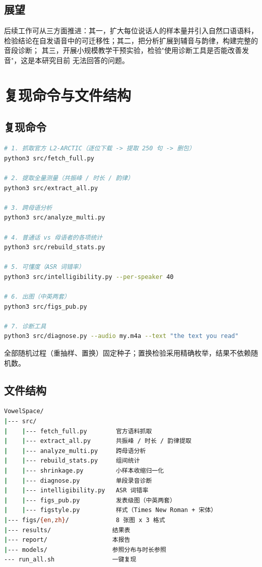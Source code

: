 \documentclass[12pt,a4paper,fontset=fandol]{ctexrep}
\begin{document}
\section{展望}

后续工作可从三方面推进：其一，扩大每位说话人的样本量并引入自然口语语料，
检验结论在自发语音中的可迁移性；其二，把分析扩展到辅音与韵律，构建完整的音段诊断；
其三，开展小规模教学干预实验，检验"使用诊断工具是否能改善发音"，这是本研究目前
无法回答的问题。

\chapter{复现命令与文件结构}\label{ch:repro}

\section{复现命令}

\begin{lstlisting}[language=bash]
# 1. 抓取官方 L2-ARCTIC（逐位下载 -> 提取 250 句 -> 删包）
python3 src/fetch_full.py

# 2. 提取全量测量（共振峰 / 时长 / 韵律）
python3 src/extract_all.py

# 3. 跨母语分析
python3 src/analyze_multi.py

# 4. 普通话 vs 母语者的各项统计
python3 src/rebuild_stats.py

# 5. 可懂度（ASR 词错率）
python3 src/intelligibility.py --per-speaker 40

# 6. 出图（中英两套）
python3 src/figs_pub.py

# 7. 诊断工具
python3 src/diagnose.py --audio my.m4a --text "the text you read"
\end{lstlisting}

全部随机过程（重抽样、置换）固定种子；置换检验采用精确枚举，结果不依赖随机数。

\section{文件结构}

\begin{lstlisting}[language=bash]
VowelSpace/
|--- src/
|    |--- fetch_full.py        官方语料抓取
|    |--- extract_all.py       共振峰 / 时长 / 韵律提取
|    |--- analyze_multi.py     跨母语分析
|    |--- rebuild_stats.py     组间统计
|    |--- shrinkage.py         小样本收缩归一化
|    |--- diagnose.py          单段录音诊断
|    |--- intelligibility.py   ASR 词错率
|    |--- figs_pub.py          发表级图（中英两套）
|    |--- figstyle.py          样式（Times New Roman + 宋体）
|--- figs/{en,zh}/             8 张图 x 3 格式
|--- results/                 结果表
|--- report/                  本报告
|--- models/                  参照分布与时长参照
--- run_all.sh                一键复现
\end{lstlisting}
\end{document}
